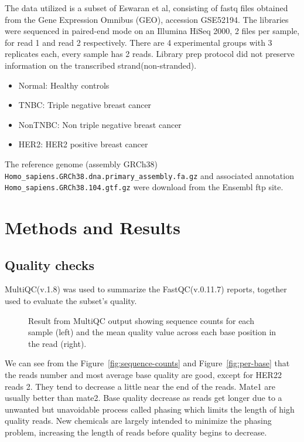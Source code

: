 \documentclass[onecolumn]{article}
\begin{document}
The data utilized is a subset of Eswaran et al\cite{Eswaran2012}, consisting of fastq files obtained from the Gene Expression Omnibus (GEO), accession GSE52194. The libraries were sequenced in paired-end mode on an Illumina HiSeq 2000, 2 files per sample, for read 1 and read 2 respectively. There are 4 experimental groups with 3 replicates each, every sample has 2 reads. Library prep protocol did not preserve information on the transcribed strand(non-stranded). 
\begin{itemize}
   \item Normal: Healthy controls
    \item TNBC: Triple negative breast cancer
    \item NonTNBC: Non triple negative breast cancer
   \item HER2: HER2 positive breast cancer
\end{itemize}

 The reference genome (assembly GRCh38) \verb|Homo_sapiens.GRCh38.dna.primary_assembly.fa.gz|  and associated annotation \verb|Homo_sapiens.GRCh38.104.gtf.gz| were download from the Ensembl ftp site. 

\section{Methods and Results}
\subsection{Quality checks}

MultiQC(v.1.8)\cite{10.1093/bioinformatics/btw354} was used to summarize the FastQC(v.0.11.7)\cite{FastQC} reports, together used to evaluate the subset's quality.

\begin{figure}[t]
\centering
{}
\caption{\label{fig:multiQC}
Result from MultiQC output showing sequence counts for each sample (left) and the mean quality value across each base position in the read (right).}
\end{figure}


We can see from the Figure~\ref{fig:sequence-counts} and Figure~\ref{fig:per-base} that the reads number and most average base quality are good, except for HER22 reads 2. They tend to decrease a little near the end of the reads. Mate1 are usually better than mate2. Base quality decrease as reads get longer due to a unwanted but unavoidable process called phasing which limits the length of high quality reads. New chemicals are largely intended to minimize the phasing problem, increasing the length of reads before quality begins to decrease.
\end{document}
